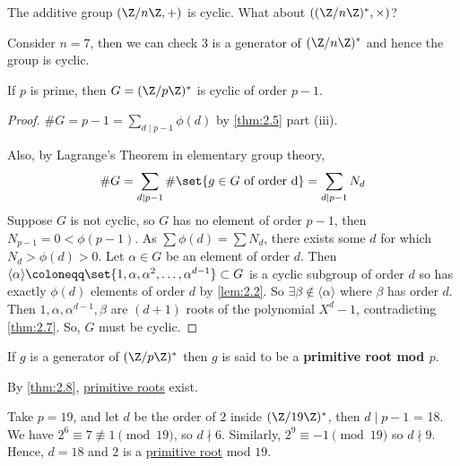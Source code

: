 \documentclass{article}
\begin{document}
The additive group $(\Z / n\Z, +)$ is cyclic. What about $((\Z/n\Z)^*, \times)$?

\begin{eg}
    Consider $n=7$, then we can check $3$ is a generator of $(\Z / n \Z)^*$ and hence the group is cyclic.
\end{eg}

\begin{nthm}\label{thm:2.8}
    If $p$ is prime, then $G = (\Z / p \Z)^*$ is cyclic of order $p-1$.
\end{nthm}

\begin{proof}
    $\# G = p-1 = \sum_{d \mid p-1} \phi(d)$ by \cref{thm:2.5} part (iii).

    Also, by Lagrange's Theorem in elementary group theory, \begin{equation*}\# G = \sum_{d \mid p-1} \# \set{g \in G \ \text{of order d}} = \sum_{d \mid p-1} N_d\end{equation*}
    Suppose $G$ is not cyclic, so $G$ has no element of order $p-1$, then ${N_{p-1} = 0 < \phi(p-1)}$.
    As $\sum \phi(d) = \sum N_d$, there exists some $d$ for which $N_d > \phi(d) > 0$. Let $\alpha \in G$ be an element of order $d$.
    Then $\langle\alpha\rangle \coloneqq \set{1, \alpha, \alpha^2, \dotsc, \alpha^{d-1}} \subset G$ is a cyclic subgroup of order $d$ so has exactly $\phi(d)$ elements of order $d$ by \cref{lem:2.2}.
    So $\exists \beta \notin \langle\alpha\rangle$ where $\beta$ has order $d$.
    Then $1, \alpha, \alpha^{d-1}, \beta$ are $(d+1)$ roots of the polynomial $X^d - 1$, contradicting \cref{thm:2.7}.
    So, $G$ must be cyclic.
\end{proof}


\begin{defi}
    If $g$ is a generator of $(\Z / p \Z)^*$ then $g$ is said to be a \textbf{primitive root mod $p$}.
\end{defi}

By \cref{thm:2.8}, \hyperlink{def:primRoot}{primitive roots} exist.

\begin{eg}
    Take $p = 19$, and let $d$ be the order of $2$ inside $(\Z/19\Z)^*$, then $d \mid p-1$ = 18.  We have $2^6 \equiv 7 \not\equiv 1 \pmod{19}$, so $d \nmid 6$.
    Similarly, $2^9 \equiv -1 \pmod{19}$ so $d \nmid 9$.  Hence, $d=18$ and $2$ is a \hyperlink{def:primRoot}{primitive root} mod $19$.
\end{eg}
\end{document}
